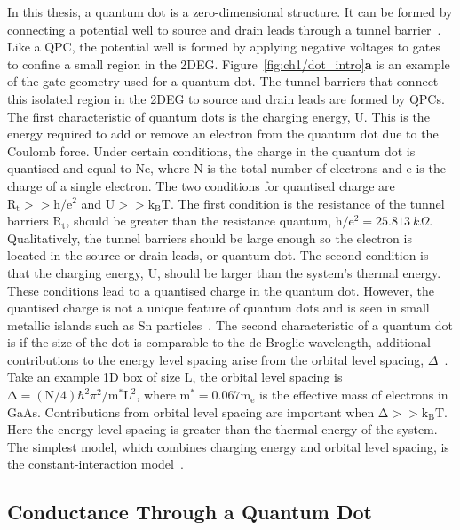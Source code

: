 In this thesis, a quantum dot is a zero-dimensional structure. It can be formed by connecting a potential well to source and drain leads through a tunnel barrier~\cite{spins_in_qd}. Like a QPC, the potential well is formed by applying negative voltages to gates to confine a small region in the 2DEG. Figure~\ref{fig:ch1/dot_intro}\textbf{a} is an example of the gate geometry used for a quantum dot. The tunnel barriers that connect this isolated region in the 2DEG to source and drain leads are formed by QPCs. The first characteristic of quantum dots is the charging energy, $\mathrm{U}$. This is the energy required to add or remove an electron from the quantum dot due to the Coulomb force. 
Under certain conditions, the charge in the quantum dot is quantised and equal to $\mathrm{Ne}$, where $\mathrm{N}$ is the total number of electrons and $\mathrm{e}$ is the charge of a single electron. The two conditions for quantised charge are $\mathrm{R_t}>>\mathrm{h/e^2}$ and $\mathrm{U}>>\mathrm{k_BT}$. The first condition is the resistance of the tunnel barriers $\mathrm{R_t}$, should be greater than the resistance quantum, $\mathrm{h/e^2}=\qty{25.813}{k\Omega}$. Qualitatively, the tunnel barriers should be large enough so the electron is located in the source or drain leads, or quantum dot. The second condition is that the charging energy, $\mathrm{U}$, should be larger than the system's thermal energy. These conditions lead to a quantised charge in the quantum dot. However, the quantised charge is not a unique feature of quantum dots and is seen in small metallic islands such as Sn particles~\cite{first_quantised_charge}.
The second characteristic of a quantum dot is if the size of the dot is comparable to the de Broglie wavelength, additional contributions to the energy level spacing arise from the orbital level spacing, $\Delta$~\cite{Kouwenhoven_1997_electron_transport, spins_in_qd}. Take an example 1D box of size $\mathrm{L}$, the orbital level spacing is $\mathrm{\Delta}=(\mathrm{N}/4)\hbar^2\pi^2 / \mathrm{m^*L^2}$, where $\mathrm{m^*}=0.067\mathrm{m_e}$ is the effective mass of electrons in GaAs. Contributions from orbital level spacing are important when $\mathrm{\Delta}>>\mathrm{k_BT}$. Here the energy level spacing is greater than the thermal energy of the system. The simplest model, which combines charging energy and orbital level spacing, is the constant-interaction model~\cite{Beenakker1991_constant_interaction}.

\afterpage{\clearpage}
\subsection{Conductance Through a Quantum Dot}


